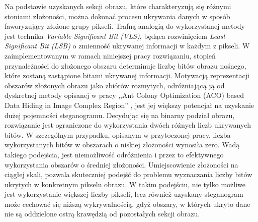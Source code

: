 {{{            %
            Na podstawie uzyskanych sekcji obrazu, które charakteryzują się różnymi stoniami złożoności, można dokonać
            procesu ukrywania danych w sposób faworyzujący złożone grupy pikseli. Trafną analogią do wykorzystanej
            metody jest technika \textit{Variable Significant Bit \textnormal{(}VLS\textnormal{)}}, będąca rozwinięciem
            \textit{Least Significant Bit \textnormal{(}LSB\textnormal{)}} o zmienność ukrywanej informacji w każdym z
            pikseli. W zaimplementowanym w ramach niniejszej pracy rozwiązaniu, stopień przynależności do złożonego
            obszaru determinuje liczbę bitów obrazu nośnego, które zostaną zastąpione bitami ukrywanej informacji.
            Motywacją reprezentacji obszarów złożonych obrazu jako zbiórów rozmytych, odróżniającą ją od dyskretnej
            metody opisanej w pracy ,,Ant Colony Optimization (ACO) based Data Hiding in Image Complex Region''
            \cite{Khan2018AntCO}, jest jej większy potencjał na uzyskanie dużej pojemności steganogramu. Decydując się
            na binarny podział obrazu, rozwiązanie jest ograniczone do wykorzystania dwóch różnych liczb ukrywanych
            bitów. W szczególnym przypadku, opisanym w przytoczonej pracy, liczba wykorzystanych bitów w obszarach o
            niskiej złożoności wynosiła zero. Wadą takiego podejścia, jest niemożliwość odróżnienia i przez to
            efektywnego wykorzystania obszarów o średniej złożoności. Umiejscowienie złożoności na ciągłej skali,
            pozwala skuteczniej podejść do problemu wyznaczania liczby bitów ukrytych w konkretnym pikselu obrazu. W
            takim podejściu, nie tylko możliwe jest wykorzystanie większej liczby pikseli, lecz również uzyskany
            steganogram może cechować się niższą wykrywalnością, gdyż obszary, w których ukryto dane nie są oddzielone
            ostrą krawędzią od pozostałych sekcji obrazu.
        }

}}

